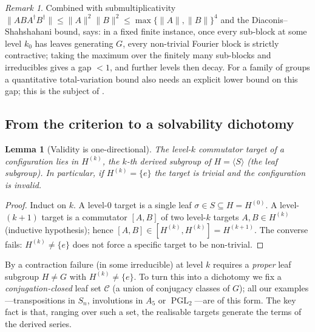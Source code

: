 \documentclass[11pt]{amsart}
\newtheorem{lemma}[lemma]{Lemma}
\theoremstyle{definition}
\theoremstyle{remark}
\newtheorem{remark}[remark]{Remark}
\theoremstyle{plain}
\theoremstyle{plain}
\numberwithin{equation}{section}
\DeclareMathOperator{\PGL}{PGL}
\newcommand{\norm}[1]{\lVert #1 \rVert}
\newcommand{\opn}[1]{\norm{#1}}
\begin{document}
\begin{remark}
Combined with submultiplicativity
$\opn{ABA^\dagger B^\dagger}\le\opn A^2\opn B^2\le\max\{\opn A,\opn B\}^4$ and
the Diaconis--Shahshahani bound,  says: in a fixed finite instance,
once every sub-block at some level $k_0$ has leaves generating $G$, every non-trivial
Fourier block is strictly contractive; taking the maximum over the finitely many
sub-blocks and irreducibles gives a gap $<1$, and further levels then decay. For a
family of groups a quantitative total-variation bound also needs an explicit
lower bound on this gap; this is the subject of .
\end{remark}

\subsection{From the criterion to a solvability dichotomy}

\begin{lemma}[Validity is one-directional]
\label{lem:valid}
The level-$k$ commutator target of a configuration lies in $H^{(k)}$, the $k$-th derived
subgroup of $H=\langle S\rangle$ (the leaf subgroup). In particular, if $H^{(k)}=\{e\}$ the
target is trivial and the configuration is \emph{invalid}.
\end{lemma}
\begin{proof}
Induct on $k$. A level-$0$ target is a single leaf $\sigma\in S\subseteq H=H^{(0)}$. A
level-$(k{+}1)$ target is a commutator $[A,B]$ of two level-$k$ targets $A,B\in H^{(k)}$
(inductive hypothesis); hence $[A,B]\in[H^{(k)},H^{(k)}]=H^{(k+1)}$. The converse fails:
$H^{(k)}\neq\{e\}$ does not force a specific target to be non-trivial.
\end{proof}

By  a contraction failure (in some irreducible) at level $k$ requires
a \emph{proper} leaf subgroup $H\neq G$ with $H^{(k)}\neq\{e\}$. To turn this into a
dichotomy we fix a \emph{conjugation-closed} leaf set $\mathcal{C}$ (a union of
conjugacy classes of $G$); all our examples---transpositions in $S_n$, involutions in
$A_5$ or $\PGL_2$---are of this form. The key fact is that, ranging over such a set, the
realisable targets generate the terms of the derived series.
\end{document}

